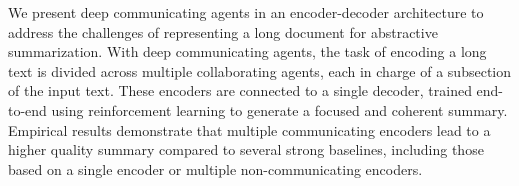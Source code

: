 We present deep communicating agents in an encoder-decoder architecture to address the challenges of representing a long document for abstractive summarization. With deep communicating agents, the task of encoding a long text is divided across multiple collaborating agents, each in charge of a subsection of the input text. These encoders are connected to a single decoder, trained end-to-end using reinforcement learning to generate a focused and coherent summary. Empirical results demonstrate that multiple communicating encoders lead to a higher quality summary compared to several strong baselines, including those based on a single encoder or multiple non-communicating encoders.
